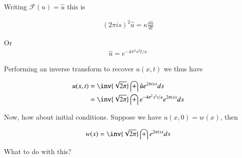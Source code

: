 \documentclass{article}
\newcommand{\FF}[0]{\mathcal{F}}
\begin{document}
Writing $\FF(u) = \hat{u}$ this is

\begin{align*}
( 2 \pi i s )^2 \hat{u} = \kappa \frac{d \hat{u}}{dt}
\end{align*}

Or
\begin{align*}
\hat{u} = e^{ -4 \pi^2 s^2 t/ \kappa }
\end{align*}

Performing an inverse transform to recover $u(x,t)$ we thus have

\begin{align*}
u(x,t) 
&= \inv{\sqrt{2\pi}} \int \hat{u} e^{2 \pi i x s } ds  \\
&= \inv{\sqrt{2\pi}} \int e^{ -4 \pi^2 s^2 t/ \kappa } e^{2 \pi i x s } ds  \\
\end{align*}

Now, how about initial conditions.  Suppose we have $u(x,0) = w(x)$, then 

\begin{align*}
w(x) &= \inv{\sqrt{2\pi}} \int e^{2 \pi i x s } ds  \\
\end{align*}

What to do with this?

%
%
\end{document}
